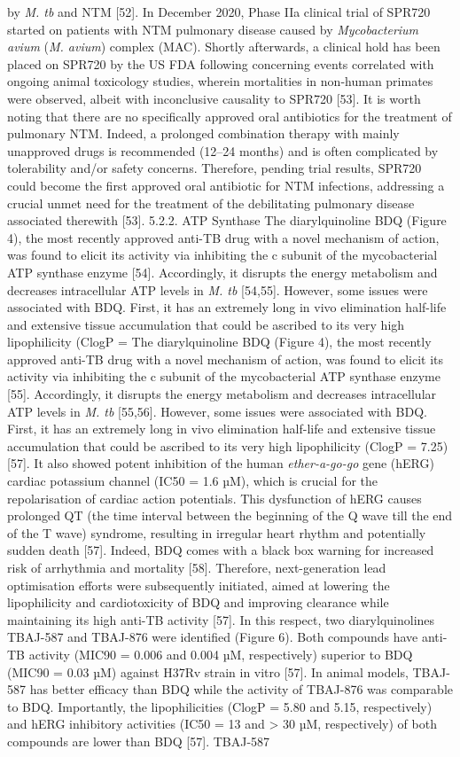 \documentclass{article}
\begin{document}
by \textit{M. tb} and NTM [52]. In December 2020, Phase IIa clinical trial of SPR720 started on patients with NTM pulmonary disease caused by \textit{Mycobacterium avium} (\textit{M. avium}) complex (MAC). Shortly afterwards, a clinical hold has been placed on SPR720 by the US FDA following concerning events correlated with ongoing animal toxicology studies, wherein mortalities in non-human primates were observed, albeit with inconclusive causality to SPR720 [53]. It is worth noting that there are no specifically approved oral antibiotics for the treatment of pulmonary NTM. Indeed, a prolonged combination therapy with mainly unapproved drugs is recommended (12–24 months) and is often complicated by tolerability and/or safety concerns. Therefore, pending trial results, SPR720 could become the first approved oral antibiotic for NTM infections, addressing a crucial unmet need for the treatment of the debilitating pulmonary disease associated therewith [53]. 5.2.2. ATP Synthase The diarylquinoline BDQ (Figure 4), the most recently approved anti-TB drug with a novel mechanism of action, was found to elicit its activity via inhibiting the c subunit of the mycobacterial ATP synthase enzyme [54]. Accordingly, it disrupts the energy metabolism and decreases intracellular ATP levels in \textit{M. tb} [54,55]. However, some issues were associated with BDQ. First, it has an extremely long in vivo elimination half-life and extensive tissue accumulation that could be ascribed to its very high lipophilicity (ClogP = The diarylquinoline BDQ (Figure 4), the most recently approved anti-TB drug with a novel mechanism of action, was found to elicit its activity via inhibiting the c subunit of the mycobacterial ATP synthase enzyme [55]. Accordingly, it disrupts the energy metabolism and decreases intracellular ATP levels in \textit{M. tb} [55,56]. However, some issues were associated with BDQ. First, it has an extremely long in vivo elimination half-life and extensive tissue accumulation that could be ascribed to its very high lipophilicity (ClogP = 7.25) [57]. It also showed potent inhibition of the human \textit{ether-a-go-go} gene (hERG) cardiac potassium channel (IC50 = 1.6 µM), which is crucial for the repolarisation of cardiac action potentials. This dysfunction of hERG causes prolonged QT (the time interval between the beginning of the Q wave till the end of the T wave) syndrome, resulting in irregular heart rhythm and potentially sudden death [57]. Indeed, BDQ comes with a black box warning for increased risk of arrhythmia and mortality [58]. Therefore, next-generation lead optimisation efforts were subsequently initiated, aimed at lowering the lipophilicity and cardiotoxicity of BDQ and improving clearance while maintaining its high anti-TB activity [57]. In this respect, two diarylquinolines TBAJ-587 and TBAJ-876 were identified (Figure 6). Both compounds have anti-TB activity (MIC90 = 0.006 and 0.004 µM, respectively) superior to BDQ (MIC90 = 0.03 µM) against H37Rv strain in vitro [57]. In animal models, TBAJ-587 has better efficacy than BDQ while the activity of TBAJ-876 was comparable to BDQ. Importantly, the lipophilicities (ClogP = 5.80 and 5.15, respectively) and hERG inhibitory activities (IC50 = 13 and > 30 µM, respectively) of both compounds are lower than BDQ [57]. TBAJ-587 
\end{document}
